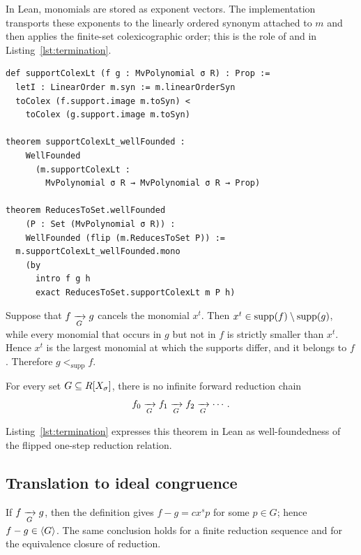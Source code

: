 In Lean, monomials are stored as exponent vectors.  The implementation
transports these exponents to the linearly ordered synonym attached to $m$
and then applies the finite-set colexicographic order; this is the role of
 and  in Listing~\ref{lst:termination}.

\begin{lstlisting}[style=lean,caption={The support-colex measure and termination of polynomial reduction.},label={lst:termination}]
def supportColexLt (f g : MvPolynomial σ R) : Prop :=
  letI : LinearOrder m.syn := m.linearOrderSyn
  toColex (f.support.image m.toSyn) <
    toColex (g.support.image m.toSyn)

theorem supportColexLt_wellFounded :
    WellFounded
      (m.supportColexLt :
        MvPolynomial σ R → MvPolynomial σ R → Prop)

theorem ReducesToSet.wellFounded
    (P : Set (MvPolynomial σ R)) :
    WellFounded (flip (m.ReducesToSet P)) :=
  m.supportColexLt_wellFounded.mono
    (by
      intro f g h
      exact ReducesToSet.supportColexLt m P h)
\end{lstlisting}

Suppose that $f\xrightarrow[G]{}g$ cancels the monomial $x^t$.  Then
$x^t\in\operatorname{supp}(f)\setminus\operatorname{supp}(g)$, while every monomial that occurs in $g$
but not in $f$ is strictly smaller than $x^t$.  Hence $x^t$ is the largest
monomial at which the supports differ, and it belongs to $f$.  Therefore
$g<_{\mathrm{supp}}f$.

\begin{theorem}\label{thm:reduction-termination}
For every set $G\subseteq R[X_\sigma]$, there is no infinite forward reduction
chain
\[
  f_0\xrightarrow[G]{}f_1\xrightarrow[G]{}f_2\xrightarrow[G]{}\cdots.
\]
\end{theorem}

Listing~\ref{lst:termination} expresses this theorem in Lean as
well-foundedness of the flipped one-step reduction relation.

\subsection{Translation to ideal congruence}

If $f\xrightarrow[G]{}g$, then the definition gives
$f-g=cx^s p$ for some $p\in G$; hence $f-g\in\langle G \rangle$.  The same conclusion
holds for a finite reduction sequence and for the equivalence closure of
reduction.


